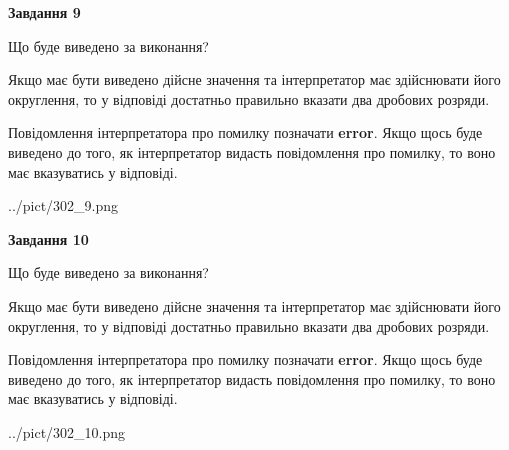 \documentclass[12pt, ukrainian]{article}
\begin{document}
{\begin {Large}
{\begin {center}\textbf{Завдання 9}\end {center}}\par
Що буде виведено за виконання? \par

Якщо має бути виведено дійсне значення та інтерпретатор має здійснювати його округлення, 
то у відповіді достатньо правильно вказати два дробових розряди.

Повідомлення інтерпретатора про помилку позначати \textbf{error}.
Якщо щось буде виведено до того, як інтерпретатор видасть повідомлення про помилку, 
то воно має вказуватись у відповіді. \par

\begin{center}
	{../pict/302_9.png}
\end{center}
\newpage

{\begin {center}\textbf{Завдання 10}\end {center}}\par
Що буде виведено за виконання? \par

Якщо має бути виведено дійсне значення та інтерпретатор має здійснювати його округлення, 
то у відповіді достатньо правильно вказати два дробових розряди.

Повідомлення інтерпретатора про помилку позначати \textbf{error}.
Якщо щось буде виведено до того, як інтерпретатор видасть повідомлення про помилку, 
то воно має вказуватись у відповіді. \par

\begin{center}
	{../pict/302_10.png}
\end{center}
\newpage

\end {Large}}
\end{document}
